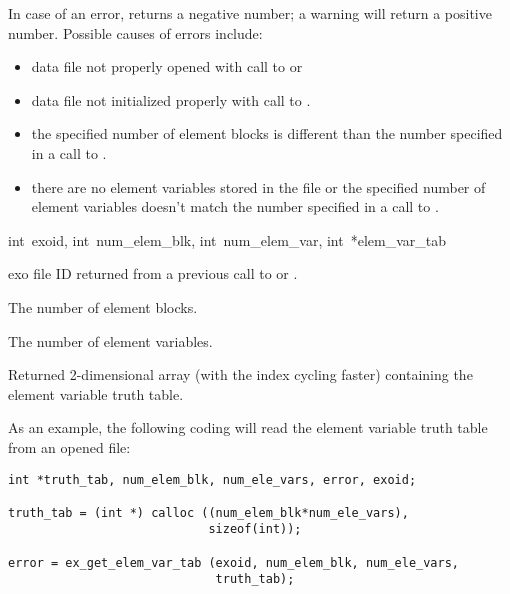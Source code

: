 In case of an error,  returns a
negative number; a warning will return a positive number.  Possible
causes of errors include:

\begin{itemize}
 \item data file not properly opened with call to 
 or 

 \item data file not initialized properly with call to
 .

 \item the specified number of element blocks is different than the
 number specified in a call to .

 \item there are no element variables stored in the file or the
 specified number of element variables doesn't match the number
 specified in a call to .
\end{itemize}


{int~exoid,
int~num_elem_blk,
int~num_elem_var,
int~*elem_var_tab}

\begin{parameters}
\item[{int exoid \R{}}]
exo{} file ID returned from a previous call to  or
.

\item[{int num_elem_blk \R{}}]
The number of element blocks.

\item[{int num_elem_var \R{}}]
The number of element variables.

\item[{int elem_var_tab[num_elem_blk,num_elem_var}{]} {\W{}}]
Returned 2-dimensional array (with the  index cycling
faster) containing the element variable truth table.
\end{parameters}

As an example, the following coding will read the element
variable truth table from an opened \exo{} file:

\begin{lstlisting}
int *truth_tab, num_elem_blk, num_ele_vars, error, exoid;

truth_tab = (int *) calloc ((num_elem_blk*num_ele_vars),
                            sizeof(int));

error = ex_get_elem_var_tab (exoid, num_elem_blk, num_ele_vars,
                             truth_tab);
\end{lstlisting}

